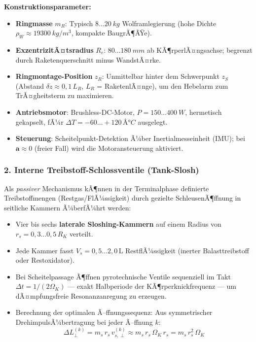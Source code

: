 ﻿\documentclass[12pt,a4paper]{article}
\newcommand{\vek}[1]{\boldsymbol{#1}}
\begin{document}
\textbf{Konstruktionsparameter:}
\begin{itemize}[leftmargin=*]
  \item \textbf{Ringmasse} $m_R$: Typisch $8\ldots\SI{20}{kg}$ Wolframlegierung
    (hohe Dichte $\rho_W \approx \SI{19300}{kg/m^3}$, kompakte BaugrÃ¶ÃŸe).
  \item \textbf{ExzentrizitÃ¤tsradius} $R_e$: $80\ldots\SI{180}{mm}$ ab KÃ¶rperlÃ¤ngsachse;
    begrenzt durch Raketenquerschnitt minus WandstÃ¤rke.
  \item \textbf{Ringmontage-Position} $z_R$: Unmittelbar hinter dem Schwerpunkt $z_S$
    (Abstand $\delta z \approx 0{,}1\,L_{R}$, $L_R$ = RaketenlÃ¤nge),
    um den Hebelarm zum TrÃ¤gheitsterm zu maximieren.
  \item \textbf{Antriebsmotor}: Brushless-DC-Motor, $P = 150\ldots\SI{400}{W}$,
    hermetisch gekapselt, fÃ¼r $\Delta T = -60\ldots+120\,Â°C$ ausgelegt.
  \item \textbf{Steuerung}: Scheitelpunkt-Detektion Ã¼ber Inertialmesseinheit (IMU);
    bei $\vek{a} \approx 0$ (freier Fall) wird die Motoransteuerung aktiviert.
\end{itemize}

\subsubsection{2. Interne Treibstoff-Schlossventile (Tank-Slosh)}

Als \emph{passiver} Mechanismus kÃ¶nnen in der Terminalphase definierte Treibstoffmengen
(Restgas/FlÃ¼ssigkeit) durch gezielte SchleusenÃ¶ffnung in seitliche Kammern Ã¼berfÃ¼hrt
werden:

\begin{itemize}[leftmargin=*]
  \item Vier bis sechs \textbf{laterale Sloshing-Kammern} auf einem Radius von
    $r_s = 0{,}3\ldots0{,}5\,R_K$ verteilt.
  \item Jede Kammer fasst $V_s = 0{,}5\ldots2{,}0\,\mathrm{L}$ RestflÃ¼ssigkeit
    (inerter Balasttreibstoff oder Restoxidator).
  \item Bei Scheitelpassage Ã¶ffnen pyrotechnische Ventile sequenziell im Takt
    $\Delta t = 1/(2\Omega_K)$ --- exakt Halbperiode der KÃ¶rperknickfrequenz ---
    um dÃ¤mpfungsfreie Resonanzanregung zu erzeugen.
  \item Berechnung der optimalen Ã–ffnungssequenz: Aus symmetrischer DrehimpulsÃ¼bertragung
    bei jeder Ã–ffnung $k$:
    \[
      \Delta L_\perp^{(k)} = m_s\,r_s\,v_{s,\perp}^{(k)}
      \approx m_s\,r_s\,\Omega_K\,r_s = m_s\,r_s^2\,\Omega_K
    \]
\end{itemize}
\end{document}
